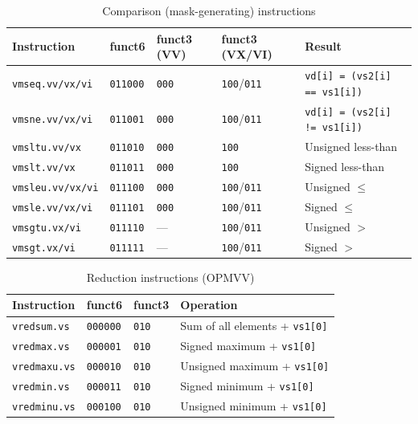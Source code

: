 \begin{table}[H]
  \centering
  \caption{Comparison (mask-generating) instructions}
  \label{tab:instr-cmp}
  \begin{tabular}{@{}lllll@{}}
    \toprule
    \textbf{Instruction} & \textbf{funct6} & \textbf{funct3 (VV)} & \textbf{funct3 (VX/VI)} & \textbf{Result} \\
    \midrule
    \texttt{vmseq.vv/vx/vi}  & \texttt{011000} & \texttt{000} & \texttt{100}/\texttt{011} & \texttt{vd[i] = (vs2[i] == vs1[i])} \\
    \texttt{vmsne.vv/vx/vi}  & \texttt{011001} & \texttt{000} & \texttt{100}/\texttt{011} & \texttt{vd[i] = (vs2[i] != vs1[i])} \\
    \texttt{vmsltu.vv/vx}    & \texttt{011010} & \texttt{000} & \texttt{100}              & Unsigned less-than \\
    \texttt{vmslt.vv/vx}     & \texttt{011011} & \texttt{000} & \texttt{100}              & Signed less-than \\
    \texttt{vmsleu.vv/vx/vi} & \texttt{011100} & \texttt{000} & \texttt{100}/\texttt{011} & Unsigned $\leq$ \\
    \texttt{vmsle.vv/vx/vi}  & \texttt{011101} & \texttt{000} & \texttt{100}/\texttt{011} & Signed $\leq$ \\
    \texttt{vmsgtu.vx/vi}    & \texttt{011110} & ---          & \texttt{100}/\texttt{011} & Unsigned $>$ \\
    \texttt{vmsgt.vx/vi}     & \texttt{011111} & ---          & \texttt{100}/\texttt{011} & Signed $>$ \\
    \bottomrule
  \end{tabular}
\end{table}

\begin{table}[H]
  \centering
  \caption{Reduction instructions (OPMVV)}
  \label{tab:instr-red}
  \begin{tabular}{@{}llll@{}}
    \toprule
    \textbf{Instruction} & \textbf{funct6} & \textbf{funct3} & \textbf{Operation} \\
    \midrule
    \texttt{vredsum.vs}  & \texttt{000000} & \texttt{010} & Sum of all elements + \texttt{vs1[0]} \\
    \texttt{vredmax.vs}  & \texttt{000001} & \texttt{010} & Signed maximum + \texttt{vs1[0]} \\
    \texttt{vredmaxu.vs} & \texttt{000010} & \texttt{010} & Unsigned maximum + \texttt{vs1[0]} \\
    \texttt{vredmin.vs}  & \texttt{000011} & \texttt{010} & Signed minimum + \texttt{vs1[0]} \\
    \texttt{vredminu.vs} & \texttt{000100} & \texttt{010} & Unsigned minimum + \texttt{vs1[0]} \\
    \bottomrule
  \end{tabular}
\end{table}

